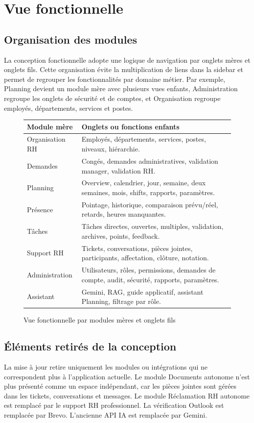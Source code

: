 \documentclass[12pt,a4paper]{report}
\begin{document}
\section{Vue fonctionnelle}
\subsection{Organisation des modules}
La conception fonctionnelle adopte une logique de navigation par onglets mères et onglets fils. Cette organisation évite la multiplication de liens dans la sidebar et permet de regrouper les fonctionnalités par domaine métier. Par exemple, Planning devient un module mère avec plusieurs vues enfants, Administration regroupe les onglets de sécurité et de comptes, et Organisation regroupe employés, départements, services et postes.

\begin{figure}[H]
\centering
\renewcommand{\arraystretch}{1.2}
\begin{tabular}{|p{4cm}|p{9cm}|}
\hline
\textbf{Module mère} & \textbf{Onglets ou fonctions enfants}\\ \hline
Organisation RH & Employés, départements, services, postes, niveaux, hiérarchie.\\ \hline
Demandes & Congés, demandes administratives, validation manager, validation RH.\\ \hline
Planning & Overview, calendrier, jour, semaine, deux semaines, mois, shifts, rapports, paramètres.\\ \hline
Présence & Pointage, historique, comparaison prévu/réel, retards, heures manquantes.\\ \hline
Tâches & Tâches directes, ouvertes, multiples, validation, archives, points, feedback.\\ \hline
Support RH & Tickets, conversations, pièces jointes, participants, affectation, clôture, notation.\\ \hline
Administration & Utilisateurs, rôles, permissions, demandes de compte, audit, sécurité, rapports, paramètres.\\ \hline
Assistant & Gemini, RAG, guide applicatif, assistant Planning, filtrage par rôle.\\ \hline
\end{tabular}
\caption{Vue fonctionnelle par modules mères et onglets fils}
\label{fig:modules-ladder}
\end{figure}

\subsection{Éléments retirés de la conception}
La mise à jour retire uniquement les modules ou intégrations qui ne correspondent plus à l'application actuelle. Le module Documents autonome n'est plus présenté comme un espace indépendant, car les pièces jointes sont gérées dans les tickets, conversations et messages. Le module Réclamation RH autonome est remplacé par le support RH professionnel. La vérification Outlook est remplacée par Brevo. L'ancienne API IA est remplacée par Gemini.
\end{document}
